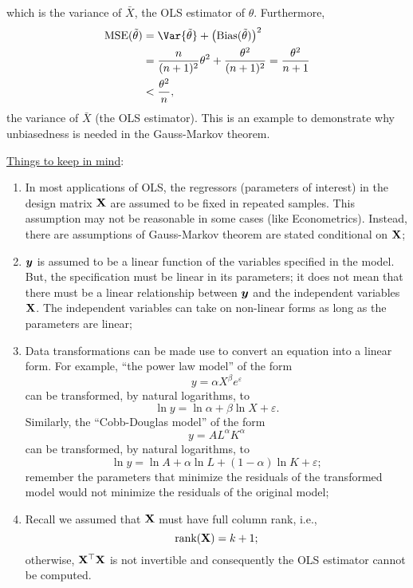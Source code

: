 which is the variance of $ \bar{X} $, the OLS estimator of $ \theta $. Furthermore,
\begin{align*}
    \text{MSE}(\tilde{\theta})
     & =\Var{\tilde{\theta}}+\bigl(\text{Bias}(\tilde{\theta})\bigr)^2          \\
     & =\frac{n}{(n+1)^2}\theta^2+\frac{\theta^2}{(n+1)^2}=\frac{\theta^2}{n+1} \\
     & <\frac{\theta^2}{n},
\end{align*}
the variance of $ \bar{X} $ (the OLS estimator). This is an example
to demonstrate why unbiasedness is needed in the Gauss-Markov theorem.

\underline{Things to keep in mind}:
\begin{enumerate}[(1)]
    \item In most applications of OLS, the regressors (parameters of interest)
          in the design matrix $ \mathbf{X} $ are assumed to be fixed in
          repeated samples. This assumption may not be reasonable in some cases (like Econometrics).
          Instead, there are assumptions of Gauss-Markov theorem are stated conditional on $ \mathbf{X} $;
    \item $ {\boldsymbol y} $ is assumed to be a linear function of the variables
          specified in the model. But, the specification must be linear in its parameters;
          it does not mean that there must be a linear relationship between $ {\boldsymbol y} $
          and the independent variables $ \mathbf{X} $. The independent variables
          can take on non-linear forms as long as the parameters are linear;
    \item Data transformations can be made use to convert an equation into a linear form.
          For example, ``the power law model'' of the form
          \[ y=\alpha X^\beta e^{\varepsilon} \]
          can be transformed, by natural logarithms, to
          \[ \ln{y}=\ln{\alpha}+\beta\ln{X}+\varepsilon. \]
          Similarly, the ``Cobb-Douglas model'' of the form
          \[ y=A L^{\alpha}K^{\alpha} \]
          can be transformed, by natural logarithms, to
          \[ \ln{y}=\ln{A}+\alpha\ln{L}+(1-\alpha)\ln{K}+\varepsilon; \]
          remember the parameters that minimize the residuals of the transformed
          model would not minimize the residuals of the original model;
    \item Recall we assumed that $ \mathbf{X} $ must have full column rank, i.e.,
          \[ \text{rank}(\mathbf{X})=k+1; \]
          otherwise, $ \mathbf{X}^\top \mathbf{X} $ is not invertible and consequently
          the OLS estimator cannot be computed.


\end{enumerate}
